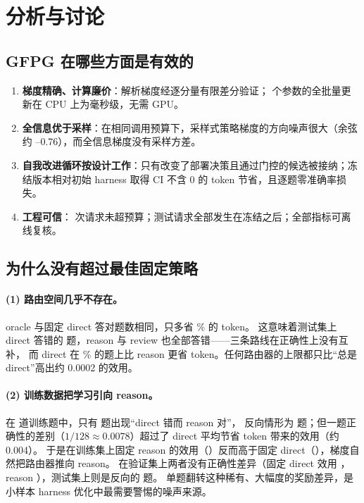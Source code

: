 \documentclass[a4paper,zihao=5,linespread=1.38]{ctexart}
\newcommand{\act}[1]{\textsf{#1}}
\begin{document}
\section{分析与讨论}\label{sec:discussion}

\subsection{GFPG 在哪些方面是有效的}
\begin{enumerate}[label=(\arabic*)]
  \item \textbf{梯度精确、计算廉价}：解析梯度经逐分量有限差分验证；\numParams{} 个参数的全批量更新在 CPU 上为毫秒级，无需 GPU。
  \item \textbf{全信息优于采样}：在相同调用预算下，采样式策略梯度的方向噪声很大（余弦约 \numReinforceCos{}–0.76），而全信息梯度没有采样方差。
  \item \textbf{自我改进循环按设计工作}：只有改变了部署决策且通过门控的候选被接纳；冻结版本相对初始 harness 取得 CI 不含 0 的 token 节省，且逐题零准确率损失。
  \item \textbf{工程可信}：\numAttempts{} 次请求未超预算；测试请求全部发生在冻结之后；全部指标可离线复核。
\end{enumerate}

\subsection{为什么没有超过最佳固定策略}\label{sec:why}
\paragraph{(1) 路由空间几乎不存在。}oracle 与固定 \act{direct} 答对题数相同，只多省 \numOracleExtraPct\% 的 token。
这意味着测试集上 \act{direct} 答错的 \numTestAllWrong{} 题，\act{reason} 与 \act{review} 也全部答错——三条路线在正确性上没有互补，
而 \act{direct} 在 \numTestDirectCheaperPct\% 的题上比 \act{reason} 更省 token。任何路由器的上限都只比“总是 \act{direct}”高出约 0.0002 的效用。

\paragraph{(2) 训练数据把学习引向 \act{reason}。}在 \numTrainN{} 道训练题中，只有 \numTrainFlipToReason{} 题出现“\act{direct} 错而 \act{reason} 对”，
反向情形为 \numTrainFlipToDirect{} 题；但一题正确性的差别（$1/128\approx0.0078$）超过了 \act{direct} 平均节省 token 带来的效用（约 0.004）。
于是在训练集上固定 \act{reason} 的效用（\numTrainReasonUtil{}）反而高于固定 \act{direct}（\numTrainDirectUtil{}），梯度自然把路由器推向 \act{reason}。
在验证集上两者没有正确性差异（固定 \act{direct} 效用 \numValDirectUtil{}，\act{reason} \numValReasonUtil{}），测试集上则是反向的 \numTestFlipToDirect{} 题。
单题翻转这种稀有、大幅度的奖励差异，是小样本 harness 优化中最需要警惕的噪声来源。
\end{document}
